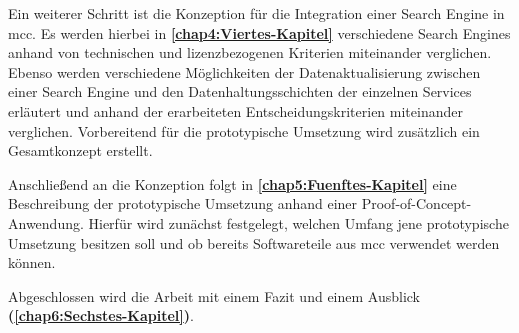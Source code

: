 Ein weiterer Schritt ist die Konzeption für die Integration einer Search Engine in \gls{mcc}. Es werden hierbei in \textbf{\autoref{chap4:Viertes-Kapitel}} verschiedene Search Engines anhand von technischen und lizenzbezogenen Kriterien miteinander verglichen. Ebenso werden verschiedene Möglichkeiten der Datenaktualisierung zwischen einer Search Engine und den Datenhaltungsschichten der einzelnen Services erläutert und anhand der erarbeiteten Entscheidungskriterien miteinander verglichen. Vorbereitend für die prototypische Umsetzung wird zusätzlich ein Gesamtkonzept erstellt.

Anschließend an die Konzeption folgt in \textbf{\autoref{chap5:Fuenftes-Kapitel}} eine Beschreibung der prototypische Umsetzung anhand einer Proof-of-Concept-Anwendung. Hierfür wird zunächst festgelegt, welchen Umfang jene prototypische Umsetzung besitzen soll und ob bereits Softwareteile aus \gls{mcc} verwendet werden können.

Abgeschlossen wird die Arbeit mit einem Fazit und einem Ausblick \textbf{(\autoref{chap6:Sechstes-Kapitel})}.